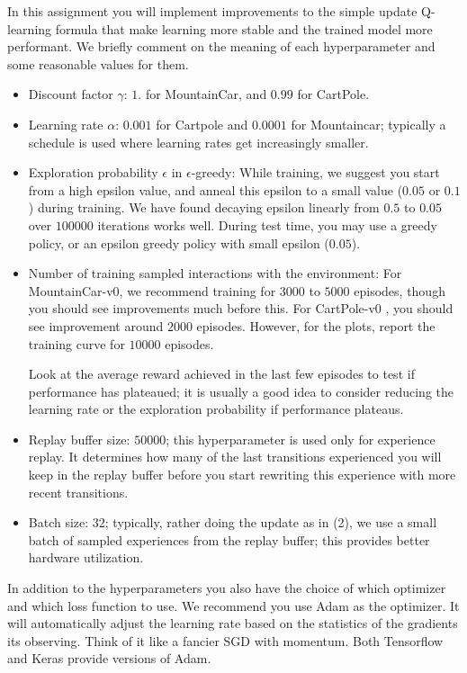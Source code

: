 \documentclass[12pt]{article}
\begin{document}
In this assignment you will implement improvements to the simple update Q-learning formula that make learning more stable and the trained model more performant. We briefly comment on the meaning of each hyperparameter and some reasonable values for them.
\begin{itemize}
	\item Discount factor $\gamma$: $1.$ for MountainCar, and $0.99$ for CartPole. 
	\item Learning rate $\alpha$: $0.001$ for Cartpole and $0.0001$ for Mountaincar; typically a schedule is used where learning rates get increasingly smaller. 
    \item Exploration probability $\epsilon$ in $\epsilon$-greedy: 
    While training, we suggest you start from a high epsilon value, and anneal this epsilon to a small value ($0.05$ or $0.1$) during training. 
    We have found decaying epsilon linearly from $0.5$ to $0.05$ over $100000$  iterations works well. 
    During test time, you may use a greedy policy, or an epsilon greedy policy with small epsilon ($0.05$).
    
	\item Number of training sampled interactions with the environment: 
	For MountainCar-v0, we recommend training for $3000$ to $5000$ episodes, though you should see improvements much before this. For CartPole-v0
	, you should see improvement around $2000$ episodes. However, for the plots, report the training curve for $10000$ episodes.
	
	Look at the average reward achieved in the last few episodes  to test if performance has plateaued; it is usually a 
    good idea to consider reducing the learning rate or the exploration 
	probability if performance plateaus.
 	
 	\item Replay buffer size: $50000$; 
	this hyperparameter is used only for experience replay. It determines how many of the last transitions experienced you will keep in the replay buffer before you start rewriting this experience with more recent transitions.
	
	\item Batch size:  32;  typically, rather doing the update as in (2), we use a small batch of sampled experiences from the replay buffer; this provides better hardware utilization.
\end{itemize}

In addition to the hyperparameters you also have the choice of which
optimizer and which loss function to use. We recommend you use Adam as
the optimizer. It will automatically adjust the learning rate based on
the statistics of the gradients its observing. Think of it like a
fancier SGD with momentum. Both Tensorflow and Keras provide versions
of Adam.
\end{document}

